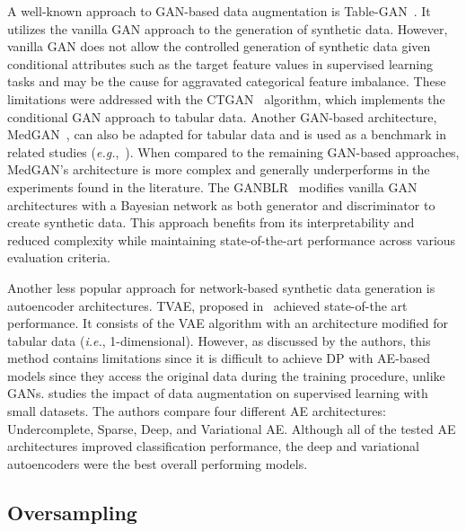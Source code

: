 A well-known approach to GAN-based data augmentation is
Table-GAN~\cite{park2018data}. It utilizes the vanilla GAN approach to the
generation of synthetic data. However, vanilla GAN does not allow the
controlled generation of synthetic data given conditional attributes such as
the target feature values in supervised learning tasks and may be the cause
for aggravated categorical feature imbalance. These limitations were addressed
with the CTGAN~\cite{xu2019modeling} algorithm, which implements the
conditional GAN approach to tabular data. Another GAN-based architecture,
MedGAN~\cite{armanious2020medgan}, can also be adapted for tabular data and is
used as a benchmark in related studies (\textit{e.g.},~\cite{xu2019modeling,
zhang2021ganblr}). When compared to the remaining GAN-based approaches,
MedGAN's architecture is more complex and generally underperforms in the
experiments found in the literature. The GANBLR~\cite{zhang2021ganblr}
modifies vanilla GAN architectures with a Bayesian network as both generator
and discriminator to create synthetic data. This approach benefits from its
interpretability and reduced complexity while maintaining state-of-the-art
performance across various evaluation criteria.

Another less popular approach for network-based synthetic data generation
is
autoencoder architectures. TVAE, proposed in~\cite{xu2019modeling} achieved
state-of-the art performance.  It consists of the VAE algorithm with an
architecture modified for tabular data (\textit{i.e.}, 1-dimensional).
However, as discussed by the authors, this method contains limitations since
it is difficult to achieve DP with AE-based models since they access the
original data during the training procedure, unlike GANs.
\cite{delgado2021deep} studies the impact of data augmentation on supervised
learning with small datasets. The authors compare four different AE
architectures: Undercomplete, Sparse, Deep, and Variational AE\@. Although all
of the tested AE architectures improved classification performance, the deep
and variational autoencoders were the best overall performing models.

\subsection{Oversampling}\label{sec:oversampling}

